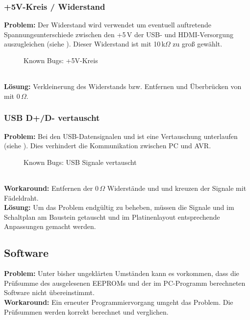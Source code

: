\subsubsection{+5V-Kreis / Widerstand}
\textbf{Problem:} Der Widerstand  wird verwendet um eventuell auftretende Spannungsunterschiede zwischen den +5\,V der USB- und HDMI-Versorgung auszugleichen (siehe ). Dieser Widerstand ist mit 10\,k$\Omega$ zu groß gewählt.
\begin{figure}[htp]
	\center
    \caption{Known Bugs: +5V-Kreis}
    \label{fig:r13}
\end{figure}\\
\textbf{Lösung:} Verkleinerung des Widerstands bzw. Entfernen und Überbrücken von  mit 0\,$\Omega$.
\subsubsection{USB D+/D- vertauscht}
\textbf{Problem:} Bei den USB-Datensignalen  und  ist eine Vertauschung unterlaufen (siehe ). Dies verhindert die Kommunikation zwischen PC und AVR.
\begin{figure}[htp]
	\center
    \caption{Known Bugs: USB Signale vertauscht}
    \label{fig:usb_vertauscht}
\end{figure}\\
\textbf{Workaround:} Entfernen der 0\,$\Omega$ Widerstände  und  und kreuzen der Signale mit Fädeldraht.\\
\textbf{Lösung:} Um das Problem endgültig zu beheben, müssen die Signale  und  im Schaltplan am Baustein  getauscht und im Platinenlayout entsprechende Anpassungen gemacht werden.
\subsection{Software}
\textbf{Problem:} Unter bisher ungeklärten Umständen kann es vorkommen, dass die Prüfsumme des ausgelesenen EEPROMs und der im PC-Programm berechneten Software nicht übereinstimmt. \\
\textbf{Workaround:} Ein erneuter Programmiervorgang umgeht das Problem. Die Prüfsummen werden korrekt berechnet und verglichen.